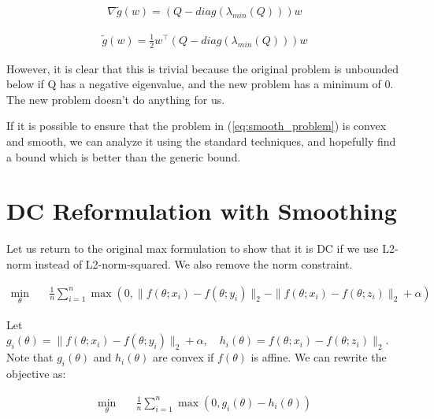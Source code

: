 \documentclass[11pt]{article}
\begin{document}
\begin{equation}
\begin{aligned}
\nabla \tilde{g}(w) = (Q - diag(\lambda_{min}(Q)))w
\end{aligned}
\end{equation}

\begin{equation}
\begin{aligned}
\tilde{g}(w) = \frac{1}{2}w^{\top}(Q - diag(\lambda_{min}(Q)))w
\end{aligned}
\end{equation}

However, it is clear that this is trivial because the original problem is unbounded below if Q has a negative eigenvalue, and the new problem has a minimum of 0. The new problem doesn't do anything for us.

If it is possible to ensure that the problem in (\ref{eq:smooth_problem}) is convex and smooth, we can analyze it using the standard techniques, and hopefully find a bound which is better than the generic bound.

\section{DC Reformulation with Smoothing}

Let us return to the original max formulation to show that it is DC if we use L2-norm instead of L2-norm-squared. We also remove the norm constraint.

\begin{equation}
\begin{aligned}
    \min_{\theta} \quad & \frac{1}{n} \sum_{i=1}^{n} \max(0, \| f(\theta; x_i) - f(\theta; y_i)\|_2 - \| f(\theta; x_i) - f(\theta; z_i)\|_2 + \alpha)
\end{aligned}
\end{equation}

Let $g_i(\theta) = \| f(\theta; x_i) - f(\theta; y_i)\|_2 + \alpha, \quad h_i(\theta) = f(\theta; x_i) - f(\theta; z_i)\|_2$. Note that $g_i(\theta)$ and $h_i(\theta)$ are convex if $f(\theta)$ is affine. We can rewrite the objective as:

\begin{equation}
\begin{aligned}
    \min_{\theta} \quad & \frac{1}{n} \sum_{i=1}^{n} \max(0, g_i(\theta) - h_i(\theta))
\end{aligned}
\end{equation}
\end{document}

